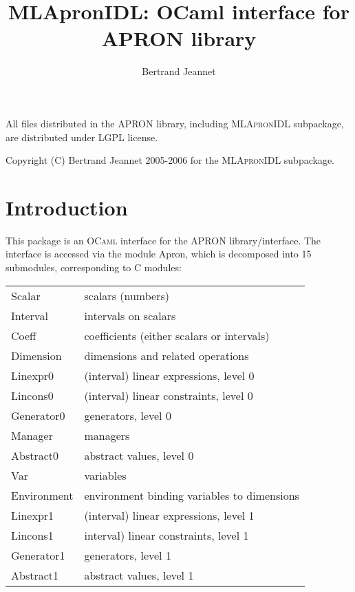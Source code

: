 \documentclass[twoside,10pt,a4paper]{report}
\title{MLApronIDL: OCaml interface for APRON library}
\author{Bertrand Jeannet}
\begin{document}
\maketitle

\vspace*{0.9\textheight}

All files distributed in the APRON library, including \textsc{MLApronIDL}
subpackage, are distributed under LGPL license.

Copyright (C) Bertrand Jeannet 2005-2006 for the
\textsc{MLApronIDL} subpackage.

\newpage

\tableofcontents

\chapter{Introduction}

This package is an \textsc{OCaml} interface for the APRON
library/interface.  The interface is accessed via the module
Apron, which is decomposed into 15 submodules, corresponding to C
modules:

\noindent
\begin{tabular}{l@{~:~~}l}
Scalar     & scalars (numbers) \\
Interval   & intervals on scalars \\
Coeff      & coefficients (either scalars or intervals) \\
Dimension  & dimensions and related operations \\
Linexpr0   & (interval) linear expressions, level 0 \\
Lincons0   & (interval) linear constraints, level 0 \\
Generator0 & generators, level 0 \\
Manager    & managers \\
Abstract0  & abstract values, level 0 \\
Var        & variables \\
Environment& environment binding variables to dimensions \\
Linexpr1   & (interval) linear expressions, level 1 \\
Lincons1   & interval) linear constraints, level 1 \\
Generator1 & generators, level 1 \\
Abstract1  & abstract values, level 1
\end{tabular}
\end{document}
